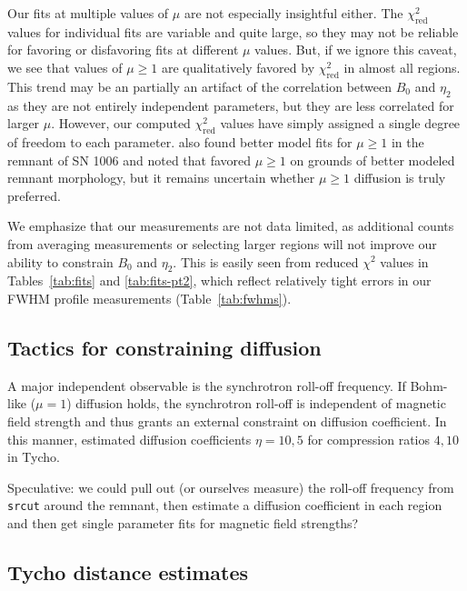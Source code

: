 \documentclass[iop, apj, numberedappendix, twocolappendix]{emulateapj}
\newcommand*{\mt}{\mathrm}
\begin{document}
Our fits at multiple values of $\mu$ are not especially insightful either.
The $\chi^2_{\mt{red}}$ values for individual fits are variable and quite
large, so they may not be reliable for favoring or disfavoring fits at
different $\mu$ values.  But, if we ignore this caveat, we see that values
of $\mu \geq 1$ are qualitatively favored by $\chi^2_{\mt{red}}$ in almost all
regions.  This trend may be an partially an artifact of the correlation between
$B_0$ and $\eta_2$ as they are not entirely independent parameters, but they
are less correlated for larger $\mu$.  However, our computed
$\chi^2_{\mt{red}}$ values have simply assigned a single degree of freedom to
each parameter.   also found better model fits for $\mu
\geq 1$ in the remnant of SN 1006 and noted that \citet{reynolds2004} favored
$\mu \geq 1$ on grounds of better modeled remnant morphology, but it remains
uncertain whether $\mu \geq 1$ diffusion is truly preferred.

We emphasize that our measurements are not data limited, as additional counts
from averaging measurements or selecting larger regions will not improve our
ability to constrain $B_0$ and $\eta_2$.  This is easily seen from reduced
$\chi^2$ values in Tables~\ref{tab:fits} and \ref{tab:fits-pt2}, which
reflect relatively tight errors in our FWHM profile measurements
(Table~\ref{tab:fwhms}).


\subsection{Tactics for constraining diffusion}

A major independent observable is the synchrotron roll-off frequency.  If
Bohm-like ($\mu = 1$) diffusion holds, the synchrotron roll-off is
independent of magnetic field strength and thus grants an external
constraint on diffusion coefficient.
In this manner, \citet{parizot2006} estimated diffusion coefficients
$\eta = 10, 5$ for compression ratios $4, 10$ in Tycho.

Speculative: we could pull out (or ourselves measure) the roll-off frequency
from \texttt{srcut} around the remnant, then estimate a diffusion coefficient
in each region and then get single parameter fits for magnetic field strengths?

\subsection{Tycho distance estimates}
\end{document}
